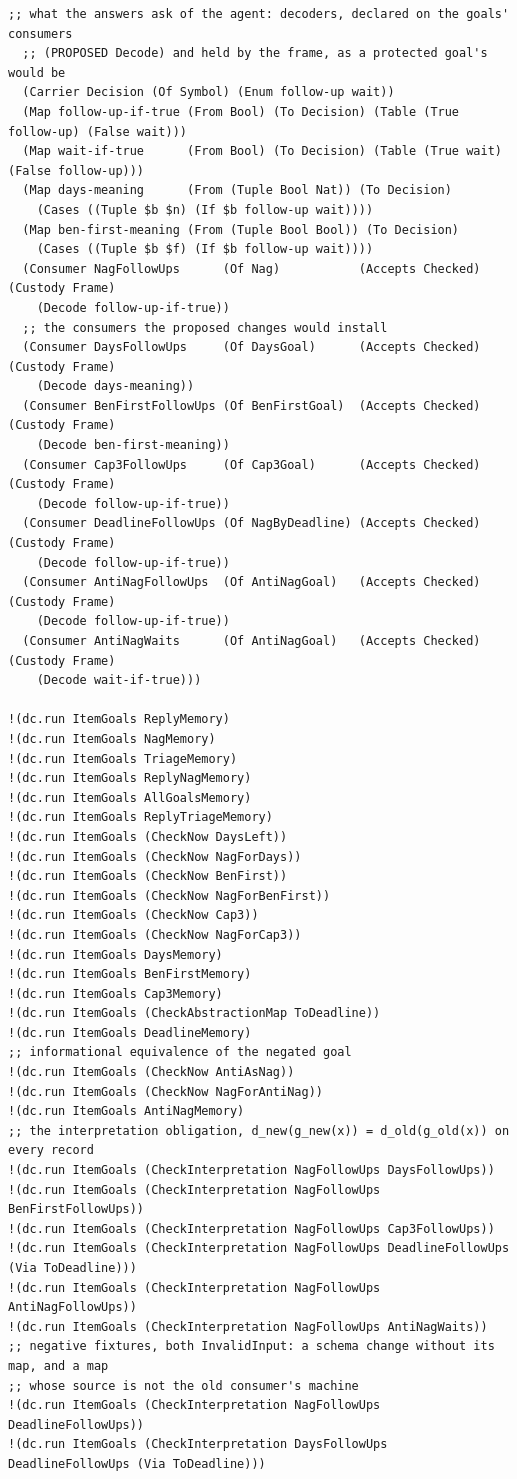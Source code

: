 \documentclass[11pt]{article}
\theoremstyle{definition}
\theoremstyle{plain}
\begin{document}
\begin{lstlisting}[style=mettamod]
  ;; what the answers ask of the agent: decoders, declared on the goals' consumers
  ;; (PROPOSED Decode) and held by the frame, as a protected goal's would be
  (Carrier Decision (Of Symbol) (Enum follow-up wait))
  (Map follow-up-if-true (From Bool) (To Decision) (Table (True follow-up) (False wait)))
  (Map wait-if-true      (From Bool) (To Decision) (Table (True wait) (False follow-up)))
  (Map days-meaning      (From (Tuple Bool Nat)) (To Decision)
    (Cases ((Tuple $b $n) (If $b follow-up wait))))
  (Map ben-first-meaning (From (Tuple Bool Bool)) (To Decision)
    (Cases ((Tuple $b $f) (If $b follow-up wait))))
  (Consumer NagFollowUps      (Of Nag)           (Accepts Checked) (Custody Frame)
    (Decode follow-up-if-true))
  ;; the consumers the proposed changes would install
  (Consumer DaysFollowUps     (Of DaysGoal)      (Accepts Checked) (Custody Frame)
    (Decode days-meaning))
  (Consumer BenFirstFollowUps (Of BenFirstGoal)  (Accepts Checked) (Custody Frame)
    (Decode ben-first-meaning))
  (Consumer Cap3FollowUps     (Of Cap3Goal)      (Accepts Checked) (Custody Frame)
    (Decode follow-up-if-true))
  (Consumer DeadlineFollowUps (Of NagByDeadline) (Accepts Checked) (Custody Frame)
    (Decode follow-up-if-true))
  (Consumer AntiNagFollowUps  (Of AntiNagGoal)   (Accepts Checked) (Custody Frame)
    (Decode follow-up-if-true))
  (Consumer AntiNagWaits      (Of AntiNagGoal)   (Accepts Checked) (Custody Frame)
    (Decode wait-if-true)))

!(dc.run ItemGoals ReplyMemory)
!(dc.run ItemGoals NagMemory)
!(dc.run ItemGoals TriageMemory)
!(dc.run ItemGoals ReplyNagMemory)
!(dc.run ItemGoals AllGoalsMemory)
!(dc.run ItemGoals ReplyTriageMemory)
!(dc.run ItemGoals (CheckNow DaysLeft))
!(dc.run ItemGoals (CheckNow NagForDays))
!(dc.run ItemGoals (CheckNow BenFirst))
!(dc.run ItemGoals (CheckNow NagForBenFirst))
!(dc.run ItemGoals (CheckNow Cap3))
!(dc.run ItemGoals (CheckNow NagForCap3))
!(dc.run ItemGoals DaysMemory)
!(dc.run ItemGoals BenFirstMemory)
!(dc.run ItemGoals Cap3Memory)
!(dc.run ItemGoals (CheckAbstractionMap ToDeadline))
!(dc.run ItemGoals DeadlineMemory)
;; informational equivalence of the negated goal
!(dc.run ItemGoals (CheckNow AntiAsNag))
!(dc.run ItemGoals (CheckNow NagForAntiNag))
!(dc.run ItemGoals AntiNagMemory)
;; the interpretation obligation, d_new(g_new(x)) = d_old(g_old(x)) on every record
!(dc.run ItemGoals (CheckInterpretation NagFollowUps DaysFollowUps))
!(dc.run ItemGoals (CheckInterpretation NagFollowUps BenFirstFollowUps))
!(dc.run ItemGoals (CheckInterpretation NagFollowUps Cap3FollowUps))
!(dc.run ItemGoals (CheckInterpretation NagFollowUps DeadlineFollowUps (Via ToDeadline)))
!(dc.run ItemGoals (CheckInterpretation NagFollowUps AntiNagFollowUps))
!(dc.run ItemGoals (CheckInterpretation NagFollowUps AntiNagWaits))
;; negative fixtures, both InvalidInput: a schema change without its map, and a map
;; whose source is not the old consumer's machine
!(dc.run ItemGoals (CheckInterpretation NagFollowUps DeadlineFollowUps))
!(dc.run ItemGoals (CheckInterpretation DaysFollowUps DeadlineFollowUps (Via ToDeadline)))
\end{lstlisting}
\end{document}
